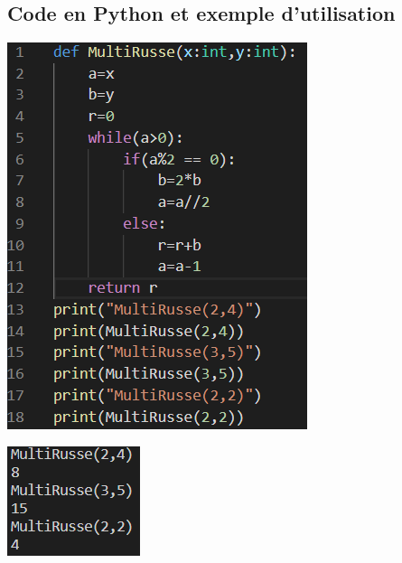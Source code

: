 \documentclass[12pt,a4paper]{report}
\begin{document}
\subsection{Code en Python et exemple d'utilisation}
\begin{center}
\begin{minipage}{0.48\linewidth}
\includegraphics[width=\linewidth]{MultRussePython}
\end{minipage}%
\hfill
\begin{minipage}{0.49\linewidth}
\includegraphics[width=\linewidth]{ExemplesPython}
\end{minipage}
\end{center}
\end{document}
